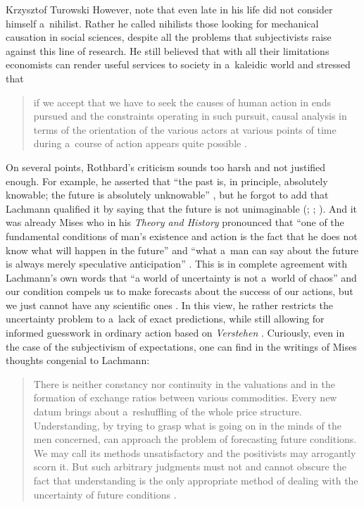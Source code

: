 \begin{artengenv}{Krzysztof Turowski}
However, note that even late in his life \textcite[140]{lachmann1986market} did not consider himself a~nihilist. Rather he called nihilists those looking for mechanical causation in social sciences, despite all the problems that subjectivists raise against this line of research.
He still believed that with all their limitations economists can render useful services to society in a~kaleidic world \parencite[7]{lachmann-shackle-place} and stressed that
\begin{quote}
if we accept that we have to seek the causes of human action in ends pursued and the constraints operating in such pursuit, causal analysis in terms of the orientation of the various actors at various points of time during a~course of action appears quite possible \parencite[200]{lachmann-hayek}.
\end{quote}

On several points, Rothbard's criticism sounds too harsh and not justified enough.
For example, he asserted that ``the past is, in principle, absolutely knowable; the future is absolutely unknowable'' \parencite[52]{rothbard-present}, but he forgot to add that Lachmann qualified it by saying that the future is not unimaginable (\cite[194]{lachmann-hayek}; \citeyear[215]{lachmann-vicissitudes}; \citeyear[265]{lachmann-speculative-markets}).
And it was already Mises who in his \emph{Theory and History} pronounced that ``one of the fundamental conditions of man's existence and action is the fact that he does not know what will happen in the future'' \parencite[180]{mises-theory} and ``what a~man can say about the future is always merely speculative anticipation'' \parencite[203]{mises-theory}.
This is in complete agreement with Lachmann's own words that ``a world of uncertainty is not a~world of chaos'' and our condition compels us to make forecasts about the success of our actions, but we just cannot have any scientific ones \parencite[139]{lachmann1986market}.
In this view, he rather restricts the uncertainty problem to a~lack of exact predictions, while still allowing for informed guesswork in ordinary action based on \emph{Verstehen} \parencite{lewin-life}.
Curiously, even in the case of the subjectivism of expectations, one can find in the writings of Mises thoughts congenial to Lachmann:
\begin{quote}
There is neither constancy nor continuity in the valuations and in the formation of exchange ratios between various commodities. Every new datum brings about a~reshuffling of the whole price structure. Understanding, by trying to grasp what is going on in the minds of the men concerned, can approach the problem of forecasting future conditions. We may call its methods unsatisfactory and the positivists may arrogantly scorn it. But such arbitrary judgments must not and cannot obscure the fact that understanding is the only appropriate method of dealing with the uncertainty of future conditions \parencite[118]{mises-ha}.
\end{quote}


\end{artengenv}
